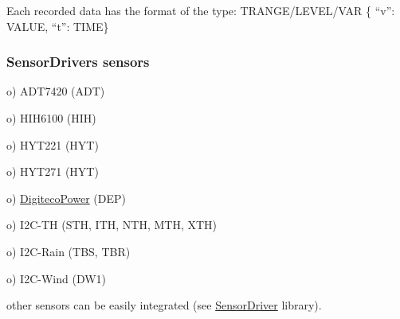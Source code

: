 Each recorded data has the format of the type\+: T\+R\+A\+N\+G\+E/\+L\+E\+V\+E\+L/\+V\+AR \{ “v”\+: V\+A\+L\+UE, “t”\+: T\+I\+ME\}\hypertarget{index_sensordriversensors}{}\subsubsection{Sensor\+Driver\textquotesingle{}s sensors}\label{index_sensordriversensors}
o) A\+D\+T7420 (A\+DT)

o) H\+I\+H6100 (H\+IH)

o) H\+Y\+T221 (H\+YT)

o) H\+Y\+T271 (H\+YT)

o) \hyperlink{namespaceDigitecoPower}{Digiteco\+Power} (D\+EP)

o) I2\+C-\/\+TH (S\+TH, I\+TH, N\+TH, M\+TH, X\+TH)

o) I2\+C-\/\+Rain (T\+BS, T\+BR)

o) I2\+C-\/\+Wind (D\+W1)

other sensors can be easily integrated (see \hyperlink{classSensorDriver}{Sensor\+Driver} library). 